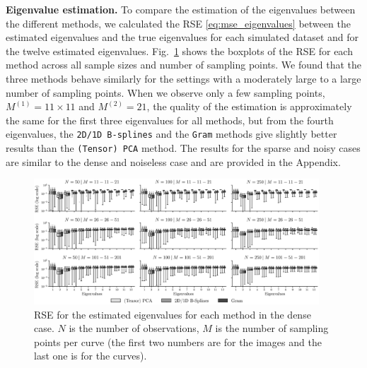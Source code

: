 \documentclass[times,sort&compress,3p]{elsarticle}
\theoremstyle{plain}%
\theoremstyle{definition}
\newenvironment{results}[1][]{\noindent \textbf{#1} \rmfamily}{\medskip}
\begin{document}
\begin{results}[Eigenvalue estimation.]
To compare the estimation of the eigenvalues between the different methods, we calculated the RSE \eqref{eq:mse_eigenvalues} between the estimated eigenvalues and the true eigenvalues for each simulated dataset and for the twelve estimated eigenvalues.
Fig.~\ref{fig:logAE_mfd_1d} shows the boxplots of the RSE for each method across all sample sizes and number of sampling points. We found that the three methods behave similarly for the settings with a moderately large to a large number of sampling points. When we observe only a few sampling points, $M^{(1)} = 11 \times 11$ and $M^{(2)} = 21$, the quality of the estimation is approximately the same for the first three eigenvalues for all methods, but from the fourth eigenvalues, the \texttt{2D/1D B-splines} and the \texttt{Gram} methods give slightly better results than the \texttt{(Tensor) PCA} method. The results for the sparse and noisy cases are similar to the dense and noiseless case and are provided in the Appendix.

\begin{figure}
    \centering
    \includegraphics[width=0.95\textwidth]{AE}
    \caption{RSE for the estimated eigenvalues for each method in the dense case. $N$ is the number of observations, $M$ is the number of sampling points per curve (the first two numbers are for the images and the last one is for the curves).}
    \label{fig:logAE_mfd_1d}
\end{figure}
\end{results}
\end{document}
